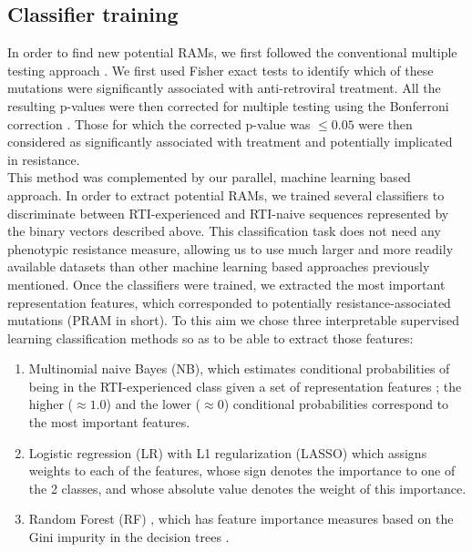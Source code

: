 \documentclass[
  11,
]{scrbook}
\begin{document}
\hypertarget{classifier-training}{%
\subsection{Classifier training}\label{classifier-training}}

In order to find new potential RAMs, we first followed the conventional
multiple testing approach \autocite{villabona-arenasIndepthAnalysisHIV12016}. We
first used Fisher exact tests to identify which of these mutations were
significantly associated with anti-retroviral treatment. All the
resulting p-values were then corrected for multiple testing using the
Bonferroni correction \autocite{goemanMultipleHypothesisTesting2014}. Those for
which the corrected p-value was \(≤ 0.05\) were then considered as
significantly associated with treatment and potentially implicated in
resistance.\\
This method was complemented by our parallel, machine learning based
approach. In order to extract potential RAMs, we trained several
classifiers to discriminate between RTI-experienced and RTI-naive
sequences represented by the binary vectors described above. This
classification task does not need any phenotypic resistance measure,
allowing us to use much larger and more readily available datasets than
other machine learning based approaches previously mentioned. Once the
classifiers were trained, we extracted the most important representation
features, which corresponded to potentially resistance-associated
mutations (PRAM in short). To this aim we chose three interpretable
supervised learning classification methods so as to be able to extract
those features:

\begin{enumerate}
\def\labelenumi{\arabic{enumi}.}
\item
  Multinomial naive Bayes (NB), which estimates conditional
  probabilities of being in the RTI-experienced class given a set of
  representation features \autocite{rennie2003tackling}; the higher
  (\(\approx 1.0\)) and the lower (\(\approx0\)) conditional probabilities
  correspond to the most important features.
\item
  Logistic regression (LR) with L1 regularization (LASSO)
  \autocite{tibshiraniRegressionShrinkageSelection1996} which assigns weights
  to each of the features, whose sign denotes the importance to one of
  the 2 classes, and whose absolute value denotes the weight of this
  importance.
\item
  Random Forest (RF) , which has feature importance measures based on
  the Gini impurity in the decision trees \autocite{breimanRandomForests2001}.
\end{enumerate}
\end{document}
